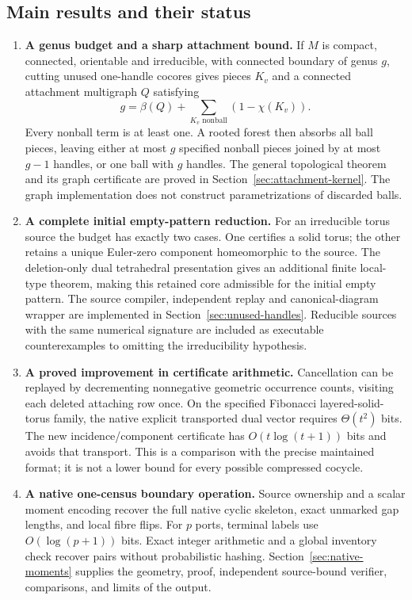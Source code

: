 \subsection{Main results and their status}

\begin{enumerate}
\item \textbf{A genus budget and a sharp attachment bound.}
If $M$ is compact, connected, orientable and irreducible, with connected
boundary of genus $g$, cutting unused one-handle cocores gives pieces
$K_v$ and a connected attachment multigraph $Q$ satisfying
\[
 g=\beta(Q)+\sum_{K_v\text{ nonball}}(1-\chi(K_v)).
\]
Every nonball term is at least one.  A rooted forest then absorbs all ball
pieces, leaving either at most $g$ specified nonball pieces joined by at
most $g-1$ handles, or one ball with $g$ handles.
The general topological theorem and its graph certificate are proved in
Section~\ref{sec:attachment-kernel}.  The graph implementation does not
construct parametrizations of discarded balls.

\item \textbf{A complete initial empty-pattern reduction.}
For an irreducible torus source the budget has exactly two cases.  One
certifies a solid torus; the other retains a unique Euler-zero component
homeomorphic to the source.  The deletion-only dual tetrahedral
presentation gives an additional finite local-type theorem, making this
retained core admissible for the initial empty pattern.  The source
compiler, independent replay and canonical-diagram wrapper are implemented
in Section~\ref{sec:unused-handles}.  Reducible sources with the same
numerical signature are included as executable counterexamples to omitting
the irreducibility hypothesis.

\item \textbf{A proved improvement in certificate arithmetic.}
Cancellation can be replayed by decrementing nonnegative geometric
occurrence counts, visiting each deleted attaching row once.  On the
specified Fibonacci layered-solid-torus family, the native explicit
transported dual vector requires $\Theta(t^2)$ bits.  The new
incidence/component certificate has $O(t\log(t+1))$ bits and avoids that
transport.  This is a comparison with the precise maintained format;
it is not a lower bound for every possible compressed cocycle.

\item \textbf{A native one-census boundary operation.}
Source ownership and a scalar moment encoding recover the full native
cyclic skeleton, exact unmarked gap lengths, and local fibre flips.
For $p$ ports, terminal labels use $O(\log(p+1))$ bits.  Exact integer
arithmetic and a global inventory check recover pairs without probabilistic
hashing.  Section~\ref{sec:native-moments} supplies the geometry, proof,
independent source-bound verifier, comparisons, and limits of the output.


\end{enumerate}
